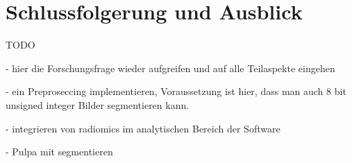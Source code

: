 \chapter{Schlussfolgerung und Ausblick}
\label{chap:schlussfolgerung}TODO

- hier die Forschungsfrage wieder aufgreifen und auf alle Teilaspekte eingehen

- ein Preproseccing implementieren, Voraussetzung ist hier, dass man auch 8 bit
unsigned integer Bilder segmentieren kann.

- integrieren von radiomics im analytischen Bereich der Software

- Pulpa mit segmentieren